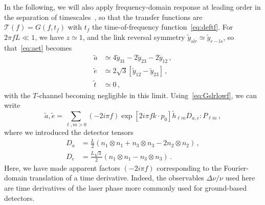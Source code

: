 \documentclass[aps,showpacs,twocolumn,prd,superscriptaddress,nofootinbib]{revtex4-1}
\newcommand{\be}{\begin{equation}}
\newcommand{\ee}{\end{equation}}
\newcommand{\bsub}{\begin{subequations}}
\newcommand{\esub}{\end{subequations}}
\newcommand\calT{{\mathcal{T}}}
\newcommand{\tf}{t_{f}}
\begin{document}
In the following, we will also apply frequency-domain response at leading order in the separation of timescales~\cite{MB18}, so that the transfer functions are $\calT(f) = G(f, \tf)$ with $\tf$ the time-of-frequency function~\eqref{eq:deftf}. For $2\pi f L \ll 1$, we have $z\simeq 1$, and the link reversal symmetry $\tilde{y}_{slr} \simeq \tilde{y}_{r-ls}$, so that~\eqref{eq:aet} becomes
\bsub\label{eq:aetlowf}
\begin{align}
	\tilde{a} &\simeq 4\tilde{y}_{31} - 2 \tilde{y}_{23} - 2 \tilde{y}_{12} \,,\\
	\tilde{e} &\simeq 2\sqrt{3} \left[ \tilde{y}_{12}  - \tilde{y}_{23} \right] \,,\\
	\tilde{t} &\simeq 0 \,,
\end{align}
\esub
with the $T$-channel becoming negligible in this limit. Using~\eqref{eq:Gslrlowf}, we can write
\be\label{eq:aelowfmodes}
	\tilde{a}, \tilde{e} = \sum_{\ell, m>0} (-2i\pi f) \exp\left[ 2 i \pi f k\cdot p_{0} \right] \tilde{h}_{\ell m} D_{a,e} : P_{\ell m} \,,
\ee
where we introduced the detector tensors
\bsub\label{eq:DaDe}
\begin{align}
	D_{a} &= \frac{L}{2} \left( n_{1}\otimes n_{1} + n_{3} \otimes n_{3} - 2 n_{2} \otimes n_{2} \right) \,,\\
	D_{e} &= \frac{L\sqrt{3}}{2} \left( n_{1} \otimes n_{1} - n_{3} \otimes n_{3} \right) \,.
\end{align}
\esub
Here, we have made apparent factors $(-2i\pi f)$ corresponding to the Fourier-domain translation of a time derivative. Indeed, the observables $\Delta \nu / \nu$ used here are time derivatives of the laser phase more commonly used for ground-based detectors.
\end{document}
